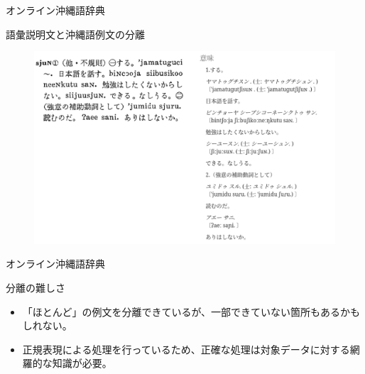 \documentclass[14pt]{beamer}
\begin{document}
\begin{frame}{オンライン沖縄語辞典}
  \begin{block}{語彙説明文と沖縄語例文の分離}
    \begin{figure}[ht]
      \centering
      \begin{minipage}{\paperwidth}
        \includegraphics[height=0.6\paperheight,width=0.7\paperwidth]{okinawago-app-explanation-example.png}
      \end{minipage}
    \end{figure}
  \end{block}
\end{frame}

\begin{frame}{オンライン沖縄語辞典}
  \begin{block}{分離の難しさ}
    \begin{itemize}
    \item 「ほとんど」の例文を分離できているが、一部できていない箇所もあるかもしれない。
    \item 正規表現による処理を行っているため、正確な処理は対象データに対する網羅的な知識が必要。
    \end{itemize}
  \end{block}
\end{frame}
\end{document}
